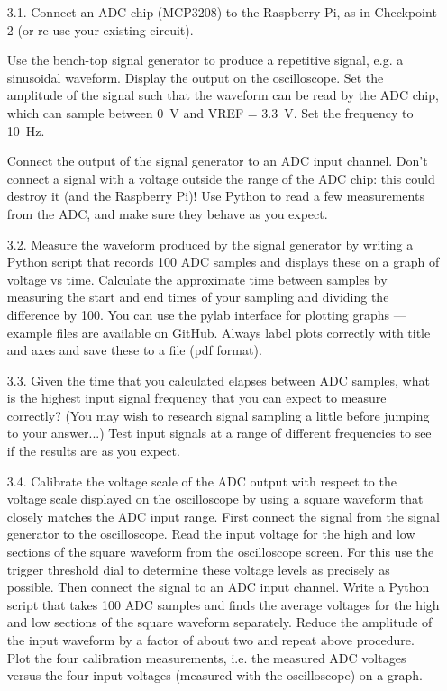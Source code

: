 \begin{enumerate}

\item [3.1.] Connect an ADC chip (MCP3208) to the Raspberry Pi, as in Checkpoint 2 (or re-use your existing circuit).

Use the bench-top signal generator to produce a repetitive signal, e.g. a sinusoidal waveform.
Display the output on the oscilloscope.
Set the amplitude of the signal such that the waveform can be read by the ADC chip, which can sample between 0~V and VREF = 3.3~V. Set the frequency to 10~Hz.

Connect the output of the signal generator to an ADC input channel.
Don't connect a signal with a voltage outside the range of the ADC chip: this could destroy it (and the Raspberry Pi)!
Use Python to read a few measurements from the ADC, and make sure they behave as you expect.

\item [3.2.] Measure the waveform produced by the signal generator by writing a Python script that records 100 ADC samples and displays these on a graph of voltage vs time.
Calculate the approximate time between samples by measuring the start and end times of your sampling and dividing the difference by 100.
You can use the pylab interface for plotting graphs --- example files are available on GitHub.
Always label plots correctly with title and axes and save these to a file (pdf format).

\item [3.3.] Given the time that you calculated elapses between ADC samples, what is the highest input signal frequency that you can expect to measure correctly?
(You may wish to research signal sampling a little before jumping to your answer...)
Test input signals at a range of different frequencies to see if the results are as you expect.

\item [3.4.] Calibrate the voltage scale of the ADC output with respect to the voltage scale displayed on the oscilloscope by using a square waveform that closely matches the ADC input range.
First connect the signal from the signal generator to the oscilloscope.
Read the input voltage for the high and low sections of the square waveform from the oscilloscope screen.
For this use the trigger threshold dial to determine these voltage levels as precisely as possible.
Then connect the signal to an ADC input channel.
Write a Python script that takes 100 ADC samples and finds the average voltages for the high and low sections of the square waveform separately.
Reduce the amplitude of the input waveform by a factor of about two and repeat above procedure.
Plot the four calibration measurements, i.e. the measured ADC voltages versus the four input voltages (measured with the oscilloscope) on a graph.


\end{enumerate}
